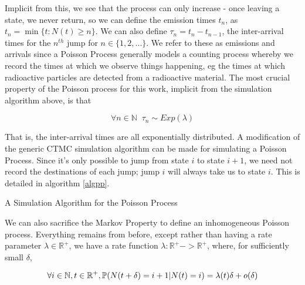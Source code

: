 Implicit from this, we see that the process can only increase - once leaving a state, we never return, so we can define the emission times $t_n$, as $t_n = \min\{t : N(t)\geqslant n\}$. We can also define $\tau_n = t_n-t_{n-1}$, the inter-arrival times for the $n^{th}$ jump for $n \in \{1,2,...\}$. We refer to these as emissions and arrivals since a Poisson Process generally models a counting process whereby we record the times at which we observe things happening, eg the times at which radioactive particles are detected from a radioactive material. The most crucial property of the Poisson process for this work, implicit from the simulation algorithm above, is that

$$
\forall n \in \mathbb{N} \; \; \tau_n \sim Exp(\lambda)
$$

That is, the inter-arrival times are all exponentially distributed. A modification of the generic CTMC simulation algorithm can be made for simulating  a Poisson Process. Since it's only possible to jump from state $i$ to state $i+1$, we need not record the destinations of each jump; jump $i$ will always take us to state $i$. This is detailed in algorithm \ref{algpp}.

\begin{algorithm}
\SetAlgoLined
{}

\caption{A Simulation Algorithm for the Poisson Process}\label{algpp}

\end{algorithm}

We can also sacrifice the Markov Property to define an inhomogeneous Poisson process. Everything remains from before, except rather than having a rate parameter $\lambda \in \mathbb{R}^{+}$, we have a rate function $\lambda : \mathbb{R}^{+} -> \mathbb{R}^{+}$, where, for sufficiently small $\delta$,

$$
\forall i \in \mathbb{N}, t \in \mathbb{R}^{+}, \mathbb{P} (N(t+\delta) = i+1 | N(t) = i) = \lambda(t) \delta + o(\delta)
$$


